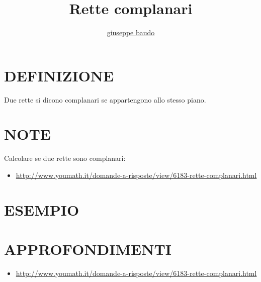 \documentclass[a4paper,10pt]{article}
\title{Rette complanari}
\author{\href{http://www.baudo.hol.es}{giuseppe baudo}}
\begin{document}
\maketitle

\section{DEFINIZIONE}
Due rette si dicono complanari se appartengono allo stesso piano.

\section{NOTE}
Calcolare se due rette sono complanari:
\begin{itemize}
 \item \url{http://www.youmath.it/domande-a-risposte/view/6183-rette-complanari.html}
\end{itemize}

\section{ESEMPIO}

\section{APPROFONDIMENTI}
\begin{itemize}
 \item \url{http://www.youmath.it/domande-a-risposte/view/6183-rette-complanari.html}
\end{itemize}
\end{document}
